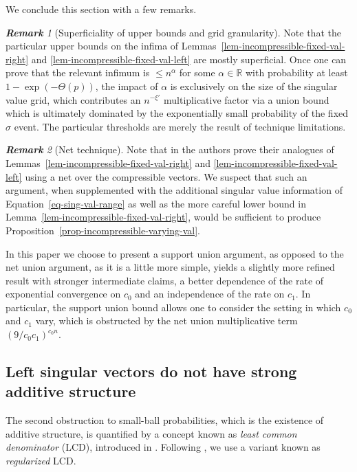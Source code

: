 \documentclass[11pt]{article}
\numberwithin{equation}{section}
\theoremstyle{remark}
\newtheorem{remark}{\bf Remark}[section]
\newcommand{\R}{\mathbb{R}}
\begin{document}
We conclude this section with a few remarks.

\begin{remark}[Superficiality of upper bounds and grid granularity]
    Note that the particular upper bounds on the infima of Lemmas~\ref{lem-incompressible-fixed-val-right} and \ref{lem-incompressible-fixed-val-left} are mostly superficial. Once one can prove that the relevant infimum is $\leq n^{\alpha}$ for some $\alpha \in \R$ with probability at least $1 - \exp(-\Theta(p))$, the impact of $\alpha$ is exclusively on the size of the singular value grid, which contributes an $n^{-\xi'}$ multiplicative factor via a union bound which is ultimately dominated by the exponentially small probability of the fixed $\sigma$ event. The particular thresholds are merely the result of technique limitations.
\end{remark}

\begin{remark}[Net technique]\label{remark-net-technique}
    Note that in \cite{christoffersen2025gaps} the authors prove their analogues of Lemmas~\ref{lem-incompressible-fixed-val-right} and \ref{lem-incompressible-fixed-val-left} using a net over the compressible vectors. We suspect that such an argument, when supplemented with the additional singular value information of Equation~\ref{eq-sing-val-range} as well as the more careful lower bound in Lemma~\ref{lem-incompressible-fixed-val-right}, would be sufficient to produce Proposition~\ref{prop-incompressible-varying-val}. 
    
    In this paper we choose to present a support union argument, as opposed to the net union argument, as it is a little more simple, yields a slightly more refined result with stronger intermediate claims, a better dependence of the rate of exponential convergence on $c_0$ and an independence of the rate on $c_1$. In particular, the support union bound allows one to consider the setting in which $c_0$ and $c_1$ vary, which is obstructed by the net union multiplicative term $(9/c_0 c_1)^{c_0 n}$.
\end{remark}

\subsection{Left singular vectors do not have strong additive structure}\label{sec-additivity}

The second obstruction to small-ball probabilities, which is the existence of additive structure, is quantified by a concept known as \textit{least common denominator} (LCD), introduced in \cite{rudelson2008littlewood}. Following \cite{christoffersen2025gaps}, we use a variant known as \textit{regularized} LCD.
\end{document}
